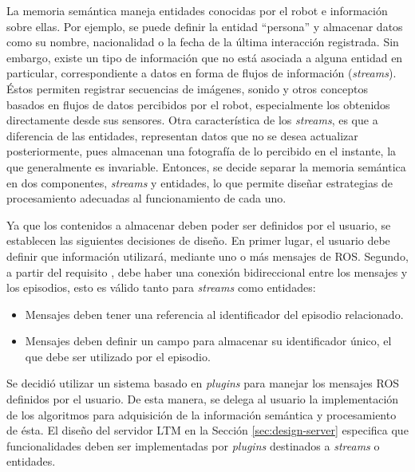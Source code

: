 La memoria semántica maneja entidades conocidas por el robot e información sobre ellas. Por ejemplo, se puede definir la entidad ``persona'' y almacenar datos como su nombre, nacionalidad o la fecha de la última interacción registrada. Sin embargo, existe un tipo de información que no está asociada a alguna entidad en particular, correspondiente a datos en forma de flujos de información (\textit{streams}). Éstos permiten registrar secuencias de imágenes, sonido y otros conceptos basados en flujos de datos percibidos por el robot, especialmente los obtenidos directamente desde sus sensores. Otra característica de los \textit{streams}, es que a diferencia de las entidades, representan datos que no se desea actualizar posteriormente, pues almacenan una fotografía de lo percibido en el instante, la que generalmente es invariable. Entonces, se decide separar la memoria semántica en dos componentes, \textit{streams} y entidades, lo que permite diseñar estrategias de procesamiento adecuadas al funcionamiento de cada uno.

Ya que los contenidos a almacenar deben poder ser definidos por el usuario, se establecen las siguientes decisiones de diseño. En primer lugar, el usuario debe definir que información utilizará, mediante uno o más mensajes de ROS. Segundo, a partir del requisito , debe haber una conexión bidireccional entre los mensajes y los episodios, esto es válido tanto para \textit{streams} como entidades:
\begin{itemize}
\item Mensajes deben tener una referencia al identificador del episodio relacionado.
\item Mensajes deben definir un campo para almacenar su identificador único, el que debe ser utilizado por el episodio.
\end{itemize}

Se decidió utilizar un sistema basado en \textit{plugins} para manejar los mensajes ROS definidos por el usuario. De esta manera, se delega al usuario la implementación de los algoritmos para adquisición de la  información semántica y procesamiento de ésta. El diseño del servidor LTM en la Sección \ref{sec:design-server} especifica que funcionalidades deben ser implementadas por \textit{plugins} destinados a \textit{streams} o entidades. 

